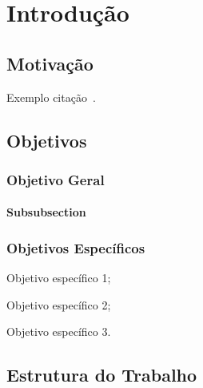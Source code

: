 \chapter{Introdução}
\label{ch:introducao}

\section{Motivação}
\label{sec:motivacao}

Exemplo citação~\cite{lamport1986latex}.

\section{Objetivos}
\label{sec:objetivos}

\subsection{Objetivo Geral}
\label{subsec:objetivo-geral}

\subsubsection{Subsubsection}
\label{subsubsec:subsubsection}

\subsection{Objetivos Específicos}
\label{subsec:objetivos-especificos}
	\begin{alineas}
	    \item Objetivo específico 1;
		\item Objetivo específico 2;
		\item Objetivo específico 3.
	\end{alineas}

\section{Estrutura do Trabalho}
\label{sec:estrutura-do-trabalho}